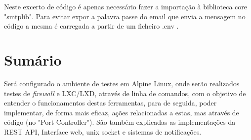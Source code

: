 Neste excerto de código é apenas necessário fazer a importação à biblioteca core
"smtplib". 
Para evitar expor a palavra passe do email que envia a mensagem no código a mesma 
é carregada a partir de um ficheiro .env .





\section*{Sumário}

Será configurado o ambiente de testes em Alpine Linux, onde serão realizados testes
de \textit{firewall} e LXC/LXD, através de linha de comandos, com o objetivo de entender 
o funcionamentos destas ferramentas, para de seguida, poder implementar, de forma mais eficaz,
ações relacionadas a estas, mas através de código (no "Port Controller"). São também 
explicadas as implementações da REST API, Interface web, unix socket e sistemas de notificações.







